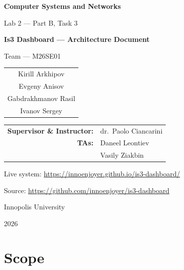 \documentclass[11pt,a4paper]{article}
\newcommand{\labno}{2}
\newcommand{\doctitle}{Is3 Dashboard --- Architecture Document}
\newcommand{\tasklabel}{Part B, Task 3}
\newcommand{\group}{M26SE01}
\newcommand{\yearofstudy}{2026}
\newcommand{\memberA}{Kirill Arkhipov}
\newcommand{\memberB}{Evgeny Anisov}
\newcommand{\memberC}{Gabdrakhmanov Rasil}
\newcommand{\memberD}{Ivanov Sergey}
\begin{document}
\begin{titlepage}
\centering
\vspace*{2.2cm}

{\LARGE\bfseries Computer Systems and Networks\par}
\vspace{0.6cm}
{\Large Lab \labno{} --- \tasklabel\par}
\vspace{0.5cm}
{\Large\bfseries \doctitle\par}

\vspace{1.8cm}
{\normalsize Team --- \group\par}
\vspace{0.5cm}
\begin{tabular}{c}
\large \memberA \\[4pt]
\large \memberB \\[4pt]
\large \memberC \\[4pt]
\large \memberD \\
\end{tabular}

\vspace{1.8cm}
\begin{tabular}{rl}
\textbf{Supervisor \& Instructor:} & dr.\ Paolo Ciancarini \\[2pt]
\textbf{TAs:}                      & Daneel Leontiev \\[2pt]
                                   & Vasily Ziakbin \\
\end{tabular}

\vfill
{\small Live system: \url{https://innoenjoyer.github.io/is3-dashboard/}\par}
{\small Source: \url{https://github.com/innoenjoyer/is3-dashboard}\par}
\vspace{0.5cm}
{\large Innopolis University\par}
{\large \yearofstudy\par}
\vspace{1.2cm}
\end{titlepage}

\section{Scope}
\end{document}
